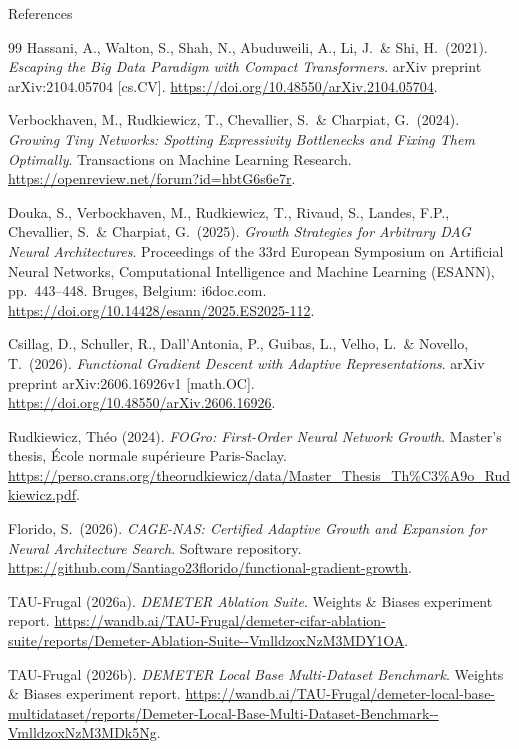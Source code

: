 \begin{frame}[allowframebreaks=0.88]{References}
\begin{thebibliography}{99}
  Hassani, A., Walton, S., Shah, N., Abuduweili, A., Li, J.\ \& Shi, H.\ (2021).
  \textit{Escaping the Big Data Paradigm with Compact Transformers}.
  arXiv preprint arXiv:2104.05704 [cs.CV].
  \url{https://doi.org/10.48550/arXiv.2104.05704}.

  Verbockhaven, M., Rudkiewicz, T., Chevallier, S.\ \& Charpiat, G.\ (2024).
  \textit{Growing Tiny Networks: Spotting Expressivity Bottlenecks and Fixing
  Them Optimally}.
  Transactions on Machine Learning Research.
  \url{https://openreview.net/forum?id=hbtG6s6e7r}.

  Douka, S., Verbockhaven, M., Rudkiewicz, T., Rivaud, S., Landes, F.P.,
  Chevallier, S.\ \& Charpiat, G.\ (2025).
  \textit{Growth Strategies for Arbitrary DAG Neural Architectures}.
  Proceedings of the 33rd European Symposium on Artificial Neural Networks,
  Computational Intelligence and Machine Learning (ESANN), pp.\ 443--448.
  Bruges, Belgium: i6doc.com.
  \url{https://doi.org/10.14428/esann/2025.ES2025-112}.

  Csillag, D., Schuller, R., Dall'Antonia, P., Guibas, L., Velho, L.\ \&
  Novello, T.\ (2026).
  \textit{Functional Gradient Descent with Adaptive Representations}.
  arXiv preprint arXiv:2606.16926v1 [math.OC].
  \url{https://doi.org/10.48550/arXiv.2606.16926}.

  Rudkiewicz, Th\'eo (2024).
  \textit{FOGro: First-Order Neural Network Growth}.
  Master's thesis, \'Ecole normale sup\'erieure Paris-Saclay.
  \url{https://perso.crans.org/theorudkiewicz/data/Master_Thesis_Th\%C3\%A9o_Rudkiewicz.pdf}.

  \framebreak

  Florido, S.\ (2026).
  \textit{CAGE-NAS: Certified Adaptive Growth and Expansion for Neural
  Architecture Search}.
  Software repository.
  \url{https://github.com/Santiago23florido/functional-gradient-growth}.

  TAU-Frugal (2026a).
  \textit{DEMETER Ablation Suite}.
  Weights \& Biases experiment report.
  \url{https://wandb.ai/TAU-Frugal/demeter-cifar-ablation-suite/reports/Demeter-Ablation-Suite--VmlldzoxNzM3MDY1OA}.

  TAU-Frugal (2026b).
  \textit{DEMETER Local Base Multi-Dataset Benchmark}.
  Weights \& Biases experiment report.
  \url{https://wandb.ai/TAU-Frugal/demeter-local-base-multidataset/reports/Demeter-Local-Base-Multi-Dataset-Benchmark--VmlldzoxNzM3MDk5Ng}.


\end{thebibliography}
\end{frame}
